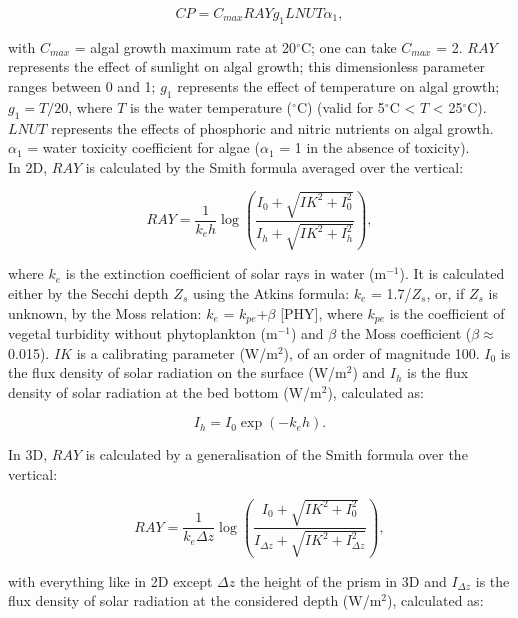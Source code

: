 \begin{equation}
  CP = C_{max} RAY g_1 LNUT \alpha_1,
\end{equation}

with $C_{max}$ = algal growth maximum rate at 20$^{\circ}$C; one can take $C_{max}$ = 2.
$RAY$ represents the effect of sunlight on algal growth;
this dimensionless parameter ranges between 0 and 1;
$g_1$ represents the effect of temperature on algal growth;
$g_1 = T/20$, where $T$ is the water temperature ($^{\circ}$C) (valid for 5$^{\circ}$C < $T$ < 25$^{\circ}$C).
$LNUT$ represents the effects of phosphoric and nitric nutrients on algal growth.
$\alpha_1$ = water toxicity coefficient for algae ($\alpha_1$ = 1 in the absence of toxicity).\\

In 2D, $RAY$ is calculated by the Smith formula averaged over the vertical:

\begin{equation}
  RAY = \frac{1}{k_e h} \log \left( \frac{I_0 + \sqrt{IK^2+I_0^2} }{ I_h + \sqrt{IK^2+I_h^2} }  \right),
\end{equation}

where $k_e$ is the extinction coefficient of solar rays in water (m$^{-1}$).
It is calculated either by the Secchi depth $Z_s$ using the Atkins formula: $k_e$ = 1.7/$Z_s$, or,
if $Z_s$ is unknown, by the Moss relation: $k_e$ = $k_{pe}$+$ \beta $ [PHY],
where $k_{pe}$ is the coefficient of vegetal turbidity without phytoplankton (m$^{-1}$)
and $ \beta $  the Moss coefficient ($ \beta \approx$ 0.015).
$IK$ is a calibrating parameter (W/m$^2$), of an order of magnitude 100.
$I_0$ is the flux density of solar radiation on the surface (W/m$^2$)
and $I_h$ is the flux density of solar radiation at the bed bottom (W/m$^2$), calculated as:

\begin{equation}
  I_h = I_0 \exp (-k_e h).
\end{equation}

In 3D, $RAY$ is calculated by a generalisation of the Smith formula
over the vertical:

\begin{equation}
  RAY = \frac{1}{k_e \Delta z} \log \left( \frac{I_0 + \sqrt{IK^2+I_0^2} }{ I_{\Delta z} + \sqrt{IK^2+I_{\Delta z}^2} }  \right),
\end{equation}

with everything like in 2D except $\Delta z$ the height of the prism in 3D and
$I_{\Delta z}$ is the flux density of solar radiation at the considered depth
(W/m$^2$), calculated as:

